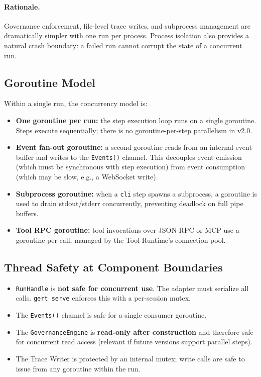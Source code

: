 \paragraph{Rationale.} Governance enforcement, file-level trace writes, and subprocess management
are dramatically simpler with one run per process. Process isolation also provides a natural
crash boundary: a failed run cannot corrupt the state of a concurrent run.

\subsection{Goroutine Model}

Within a single run, the concurrency model is:

\begin{itemize}
  \item \textbf{One goroutine per run:} the step execution loop runs on a single goroutine.
        Steps execute sequentially; there is no goroutine-per-step parallelism in v2.0.
  \item \textbf{Event fan-out goroutine:} a second goroutine reads from an internal event
        buffer and writes to the \texttt{Events()} channel. This decouples event emission
        (which must be synchronous with step execution) from event consumption (which may
        be slow, e.g., a WebSocket write).
  \item \textbf{Subprocess goroutine:} when a \texttt{cli} step spawns a subprocess, a
        goroutine is used to drain stdout/stderr concurrently, preventing deadlock on
        full pipe buffers.
  \item \textbf{Tool RPC goroutine:} tool invocations over JSON-RPC or MCP use a goroutine
        per call, managed by the Tool Runtime's connection pool.
\end{itemize}

\subsection{Thread Safety at Component Boundaries}

\begin{itemize}
  \item \texttt{RunHandle} is \textbf{not safe for concurrent use}. The adapter must
        serialize all calls. \texttt{gert serve} enforces this with a per-session mutex.
  \item The \texttt{Events()} channel is safe for a single consumer goroutine.
  \item The \texttt{GovernanceEngine} is \textbf{read-only after construction} and therefore
        safe for concurrent read access (relevant if future versions support parallel steps).
  \item The Trace Writer is protected by an internal mutex; write calls are safe to issue
        from any goroutine within the run.
\end{itemize}

